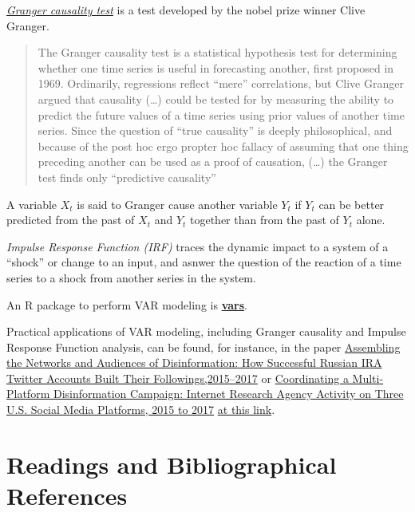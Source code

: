 \documentclass[
]{article}
\begin{document}
\href{https://en.wikipedia.org/wiki/Granger_causality}{\emph{Granger causality test}} is a test developed by the nobel prize winner Clive Granger.

\begin{quote}
The Granger causality test is a statistical hypothesis test for determining whether one time series is useful in forecasting another, first proposed in 1969. Ordinarily, regressions reflect ``mere'' correlations, but Clive Granger argued that causality (\ldots) could be tested for by measuring the ability to predict the future values of a time series using prior values of another time series. Since the question of ``true causality'' is deeply philosophical, and because of the post hoc ergo propter hoc fallacy of assuming that one thing preceding another can be used as a proof of causation, (\ldots) the Granger test finds only ``predictive causality''
\end{quote}

A variable \(X_t\) is said to Granger cause another variable \(Y_t\) if \(Y_t\) can be better predicted from the past of \(X_t\) and \(Y_t\) together than from the past of \(Y_t\) alone.

\emph{Impulse Response Function (IRF)} traces the dynamic impact to a system of a ``shock'' or change to an input, and asnwer the question of the reaction of a time series to a shock from another series in the system.

An R package to perform VAR modeling is \href{https://cran.r-project.org/web/packages/vars/vars.pdf}{\textbf{vars}}.

Practical applications of VAR modeling, including Granger causality and Impulse Response Function analysis, can be found, for instance, in the paper \href{https://academic.oup.com/joc/article-abstract/71/2/305/6104044}{Assembling the Networks and Audiences of Disinformation: How Successful Russian IRA Twitter Accounts Built Their Followings,2015--2017} or
\href{https://www-tandfonline-com.uaccess.univie.ac.at/doi/full/10.1080/10584609.2019.1661889}{Coordinating a Multi-Platform Disinformation Campaign: Internet Research Agency Activity on Three U.S. Social Media Platforms, 2015 to 2017} \href{https://github.com/jlukito/timeseries-bootcamp/blob/master/3_multivariate/varmodeling.md}{at this link}.

\hypertarget{readings-and-bibliographical-references}{%
\section{Readings and Bibliographical References}\label{readings-and-bibliographical-references}}
\end{document}

